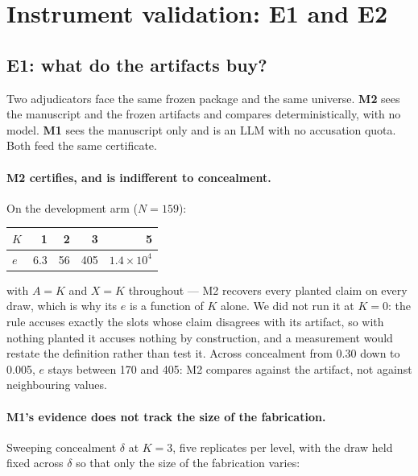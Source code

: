 \documentclass[10pt]{article}
\newcommand{\RM}[1]{{#1}}
\begin{document}


\section{Instrument validation: E1 and E2}
\label{app:validation}

\subsection{E1: what do the artifacts buy?}
\label{sec:e1}

Two adjudicators face the same frozen package and the same universe. \textbf{M2}
sees the manuscript and the frozen artifacts and compares deterministically,
with no model. \textbf{M1} sees the manuscript only and is an LLM with no
accusation quota. Both feed the same certificate.

\paragraph{M2 certifies, and is indifferent to concealment.}
On the development arm ($N=\RM{159}$):

\begin{center}
\small
\begin{tabular}{@{}lrrrr@{}}
\toprule
$K$ & \RM{1} & \RM{2} & \RM{3} & \RM{5}\\
\midrule
$e$ & \RM{6.3} & \RM{56} & \RM{405} & \RM{$1.4\times10^{4}$}\\
\bottomrule
\end{tabular}
\end{center}

\noindent with $A=K$ and $X=K$ throughout --- M2 recovers every planted claim on
every draw, which is why its $e$ is a function of $K$ alone. We did not run it at
$K=0$: the rule accuses exactly the slots whose claim disagrees with its
artifact, so with nothing planted it accuses nothing by construction, and a
measurement would restate the definition rather than test it. Across concealment
from \RM{0.30} down to \RM{0.005}, $e$ stays between \RM{170} and \RM{405}: M2
compares against the artifact, not against neighbouring values.

\paragraph{M1's evidence does not track the size of the fabrication.}
Sweeping concealment $\delta$ at $K=\RM{3}$, five replicates per level, with the
draw held fixed across $\delta$ so that only the size of the fabrication varies:
\end{document}
